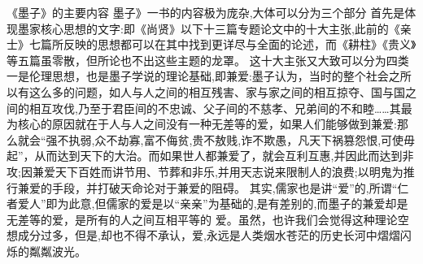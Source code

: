 \documentclass[12pt,UTF8]{ctexbook}
\begin{document}
《墨子》的主要内容
墨子》一书的内容极为庞杂,大体可以分为三个部分
首先是体现墨家核心思想的文字:即《尚贤》以下十三篇专题论文中的十大主张,此前的《亲士》七篇所反映的思想都可以在其中找到更详尽与全面的论述，而《耕柱》《贵义》等五篇虽零散，但所论也不出这些主题的龙罩。
这十大主张又大致可以分为四类
一是伦理思想，也是墨子学说的理论基础,即兼爱:墨子认为，当时的整个社会之所以有这么多的问题，如人与人之间的相互残害、家与家之间的相互掠夺、国与国之间的相互攻伐,乃至于君臣间的不忠诚、父子间的不慈孝、兄弟间的不和睦……其最为核心的原因就在于人与人之间没有一种无差等的爱，如果人们能够做到兼爱:那么就会“强不执弱,众不劫寡,富不侮贫,贵不敖贱,诈不欺愚，凡天下祸篡怨恨,可使毋起”，从而达到天下的大治。而如果世人都兼爱了，就会互利互惠,并因此而达到非攻;因兼爱天下百姓而讲节用、节葬和非乐,并用天志说来限制人的浪费;以明鬼为推行兼爱的手段，并打破天命论对于兼爱的阻碍。
其实,儒家也是讲“爱”的,所谓“仁者爱人”即为此意,但儒家的爱是以“亲亲”为基础的,是有差别的,而墨子的兼爱却是无差等的爱，是所有的人之间互相平等的
爱。虽然，也许我们会觉得这种理论空想成分过多，但是,却也不得不承认，爱,永远是人类烟水苍茫的历史长河中熠熠闪烁的粼粼波光。
\end{document}
